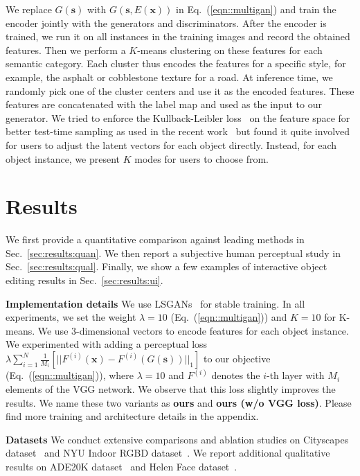\documentclass[10pt,twocolumn,letterpaper]{article}
\newcommand{\refsec}[1]{Sec.~\ref{sec:#1}}
\newcommand{\lblsec}[1]{\label{sec:#1}}
\newcommand{\s}{\mathbf{s}}
\newcommand{\x}{\mathbf{x}}
\newcommand{\ours}{ours\xspace}
\begin{document}
We replace $G(\s)$ with $G(\s, E(\x))$ in Eq.~(\ref{eqn::multigan}) and train the encoder jointly with the generators and discriminators. After the encoder is trained, we run it on all instances in the training images and record the obtained features. Then we perform a $K$-means clustering on these features for each semantic category.
Each cluster thus encodes the features for a specific style, for example, the asphalt or cobblestone texture for a road.
At inference time, we randomly pick one of the cluster centers and use it as the encoded features. These features are concatenated with the label map and used as the input to our generator. We tried to enforce the Kullback-Leibler loss~\cite{kingma2013auto} on the feature space for better test-time sampling as used in the recent work~\cite{zhu2017toward} but found it quite involved for users to adjust the latent vectors for each object directly. Instead, for each object instance, we  present $K$ modes for users to choose from.
 
\section{Results} \lblsec{results}

We first provide a quantitative comparison against leading methods in \refsec{results:quan}. We then report a subjective human perceptual study in \refsec{results:qual}. Finally, we show a few examples of interactive object editing results in \refsec{results:ui}. 

\vspace{.03in}
{\noindent \bf Implementation details}
We use LSGANs~\cite{mao2017least} for stable training. In all experiments, we set the weight ${\lambda=10}$ (Eq.~(\ref{eqn::multigan})) and ${K=10}$ for K-means. We use $3$-dimensional vectors to encode features for each object instance. We experimented with adding a perceptual loss $\lambda \sum_{i=1}^N\frac{1}{M_i}[||F^{(i)}(\x)-F^{(i)}(G(\s))||_1]$ to our objective (Eq.~(\ref{eqn::multigan})), where $\lambda=10$ and $F^{(i)}$ denotes the $i$-th layer with $M_i$  elements of the VGG network. We observe that this loss slightly improves the results. We name these two variants as \textbf{\ours} and \textbf{ours (w/o VGG loss)}. Please find more training and architecture details in the appendix.

\vspace{.03in}
{\noindent \bf Datasets} We conduct extensive comparisons and ablation studies on Cityscapes dataset~\cite{Cordts2016cityscapes} and NYU Indoor RGBD dataset~\cite{Silberman2012indoor}. We report additional qualitative results on ADE20K dataset~\cite{zhou2017scene} and Helen Face dataset~\cite{le2012interactive,smith2013exemplar}.
\end{document}
